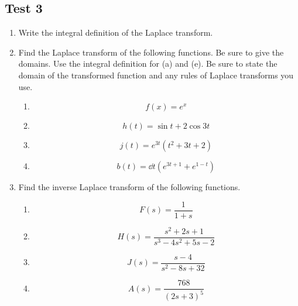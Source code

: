 \subsection{Test 3}

\begin{enumerate}[label=\arabic*.]
	\item
		Write the integral definition of the Laplace transform.
	\item 
		Find the Laplace transform of the following functions. Be sure to give the domains. Use the integral definition for (a) and (e). Be sure to state the domain of the transformed function and any rules of Laplace transforms you use.
		\begin{enumerate}[label = (\alph*)]
			\item
				\begin{equation*}
					f(x) = e^x
				\end{equation*}
			\item
				\begin{equation*}
					h(t) = \sin{t} + 2\cos{3t}
				\end{equation*}
			\item
				\begin{equation*}
					j(t) = e^{3t}\left(t^2 + 3t + 2\right)
				\end{equation*}
			\item
				\begin{equation*}
					b(t) = \dd{}{t}{(e^{3t+1} + e^{1-t})}
				\end{equation*}
		\end{enumerate}
	\item
		Find the inverse Laplace transform of the following functions.
		\begin{enumerate}[label=(\alph*)]
			\item
				\begin{equation*}
					F(s) = \frac{1}{1+s}
				\end{equation*}
			\item
				\begin{equation*}
					H(s) = \frac{s^2+2s+1}{s^3 - 4s^2 + 5s - 2}					
				\end{equation*}
			\item
				\begin{equation*}
					J(s) = \frac{s-4}{s^2 -8s + 32}
				\end{equation*}
			\item
				\begin{equation*}
					A(s) = \frac{768}{(2s+3)^5}
				\end{equation*}

\end{enumerate}
\end{enumerate}
